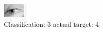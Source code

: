 \begin{figure}[h!]
\begin{center}
\includegraphics[width=0.60\columnwidth]{figures/ID2971_class_3_target_4.png}
\end{center}
\caption{ Classification: 3 actual target: 4}
\label{fig:ID2971_class_3_target_4}
\end{figure}
